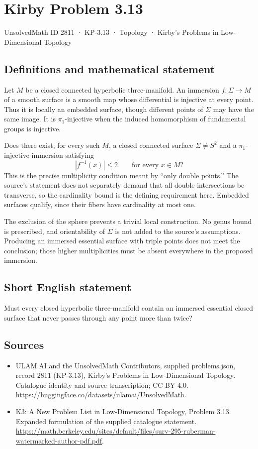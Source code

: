 \documentclass[11pt,a4paper]{article}
\begin{document}
\section*{Kirby Problem 3.13}\label{2811}
{\small UnsolvedMath ID 2811 · KP-3.13 · Topology · Kirby's Problems in Low-Dimensional Topology}
\subsection{Definitions and mathematical statement}
Let $M$ be a closed connected hyperbolic three-manifold. An immersion
$f:\Sigma\to M$ of a smooth surface is a smooth map whose differential is
injective at every point. Thus it is locally an embedded surface, though
different points of $\Sigma$ may have the same image. It is $\pi_1$-injective
when the induced homomorphism of fundamental groups is injective.

Does there exist, for every such $M$, a closed connected surface
$\Sigma\ne S^2$ and a $\pi_1$-injective immersion satisfying
\[
 |f^{-1}(x)|\leq2\qquad\text{for every }x\in M?
\]
This is the precise multiplicity condition meant by ``only double points.''
The source's statement does not separately demand that all double intersections
be transverse, so the cardinality bound is the defining requirement here.
Embedded surfaces qualify, since their fibers have cardinality at most one.

The exclusion of the sphere prevents a trivial local construction. No genus
bound is prescribed, and orientability of $\Sigma$ is not added to the
source's assumptions. Producing an immersed essential surface with triple
points does not meet the conclusion; those higher multiplicities must be
absent everywhere in the proposed immersion.
\subsection{Short English statement}
Must every closed hyperbolic three-manifold contain an immersed essential closed surface that never passes through any point more than twice?
\subsection{Sources}
\begin{itemize}
\item[S1] ULAM.AI and the UnsolvedMath Contributors, supplied problems.json, record 2811 (KP-3.13), Kirby's Problems in Low-Dimensional Topology. Catalogue identity and source transcription; CC BY 4.0.
\url{https://huggingface.co/datasets/ulamai/UnsolvedMath}.
\item[S2] K3: A New Problem List in Low-Dimensional Topology, Problem 3.13. Expanded formulation of the supplied catalogue statement.
\url{https://math.berkeley.edu/sites/default/files/surv-295-ruberman-watermarked-author-pdf.pdf}.
\end{itemize}
\end{document}
